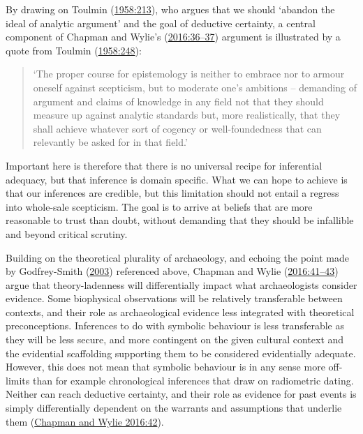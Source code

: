 \documentclass[
  12pt,
  a4paper,
  oneside]{book}
\begin{document}
By drawing on Toulmin (\protect\hyperlink{ref-toulmin1958}{1958:213}), who argues that we should `abandon the ideal of analytic argument' and the goal of deductive certainty, a central component of Chapman and Wylie's (\protect\hyperlink{ref-chapman2016}{2016:36--37}) argument is illustrated by a quote from Toulmin (\protect\hyperlink{ref-toulmin1958}{1958:248}):

\begin{quote}
`The proper course for epistemology is neither to embrace nor to armour oneself against scepticism, but to moderate one's ambitions -- demanding of argument and claims of knowledge in any field not that they should measure up against analytic standards but, more realistically, that they shall achieve whatever sort of cogency or well-foundedness that can relevantly be asked for in that field.'
\end{quote}

Important here is therefore that there is no universal recipe for inferential adequacy, but that inference is domain specific. What we can hope to achieve is that our inferences are credible, but this limitation should not entail a regress into whole-sale scepticism. The goal is to arrive at beliefs that are more reasonable to trust than doubt, without demanding that they should be infallible and beyond critical scrutiny.

Building on the theoretical plurality of archaeology, and echoing the point made by Godfrey-Smith (\protect\hyperlink{ref-godfrey-smith2003}{2003}) referenced above, Chapman and Wylie (\protect\hyperlink{ref-chapman2016}{2016:41--43}) argue that theory-ladenness will differentially impact what archaeologists consider evidence. Some biophysical observations will be relatively transferable between contexts, and their role as archaeological evidence less integrated with theoretical preconceptions. Inferences to do with symbolic behaviour is less transferable as they will be less secure, and more contingent on the given cultural context and the evidential scaffolding supporting them to be considered evidentially adequate. However, this does not mean that symbolic behaviour is in any sense more off-limits than for example chronological inferences that draw on radiometric dating. Neither can reach deductive certainty, and their role as evidence for past events is simply differentially dependent on the warrants and assumptions that underlie them (\protect\hyperlink{ref-chapman2016}{Chapman and Wylie 2016:42}).
\end{document}
